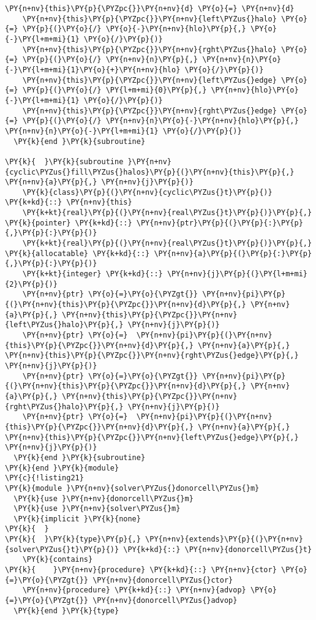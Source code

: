 \begin{Verbatim}[commandchars=\\\{\}]
    \PY{n+nv}{this}\PY{p}{\PYZpc{}}\PY{n+nv}{d} \PY{o}{=} \PY{n+nv}{d}
    \PY{n+nv}{this}\PY{p}{\PYZpc{}}\PY{n+nv}{left\PYZus{}halo} \PY{o}{=} \PY{p}{(}\PY{o}{/} \PY{o}{-}\PY{n+nv}{hlo}\PY{p}{,} \PY{o}{-}\PY{l+m+mi}{1} \PY{o}{/}\PY{p}{)} 
    \PY{n+nv}{this}\PY{p}{\PYZpc{}}\PY{n+nv}{rght\PYZus{}halo} \PY{o}{=} \PY{p}{(}\PY{o}{/} \PY{n+nv}{n}\PY{p}{,} \PY{n+nv}{n}\PY{o}{-}\PY{l+m+mi}{1}\PY{o}{+}\PY{n+nv}{hlo} \PY{o}{/}\PY{p}{)} 
    \PY{n+nv}{this}\PY{p}{\PYZpc{}}\PY{n+nv}{left\PYZus{}edge} \PY{o}{=} \PY{p}{(}\PY{o}{/} \PY{l+m+mi}{0}\PY{p}{,} \PY{n+nv}{hlo}\PY{o}{-}\PY{l+m+mi}{1} \PY{o}{/}\PY{p}{)}
    \PY{n+nv}{this}\PY{p}{\PYZpc{}}\PY{n+nv}{rght\PYZus{}edge} \PY{o}{=} \PY{p}{(}\PY{o}{/} \PY{n+nv}{n}\PY{o}{-}\PY{n+nv}{hlo}\PY{p}{,} \PY{n+nv}{n}\PY{o}{-}\PY{l+m+mi}{1} \PY{o}{/}\PY{p}{)}
  \PY{k}{end }\PY{k}{subroutine}

\PY{k}{  }\PY{k}{subroutine }\PY{n+nv}{cyclic\PYZus{}fill\PYZus{}halos}\PY{p}{(}\PY{n+nv}{this}\PY{p}{,} \PY{n+nv}{a}\PY{p}{,} \PY{n+nv}{j}\PY{p}{)}
    \PY{k}{class}\PY{p}{(}\PY{n+nv}{cyclic\PYZus{}t}\PY{p}{)} \PY{k+kd}{::} \PY{n+nv}{this}
    \PY{k+kt}{real}\PY{p}{(}\PY{n+nv}{real\PYZus{}t}\PY{p}{)}\PY{p}{,} \PY{k}{pointer} \PY{k+kd}{::} \PY{n+nv}{ptr}\PY{p}{(}\PY{p}{:}\PY{p}{,}\PY{p}{:}\PY{p}{)}
    \PY{k+kt}{real}\PY{p}{(}\PY{n+nv}{real\PYZus{}t}\PY{p}{)}\PY{p}{,} \PY{k}{allocatable} \PY{k+kd}{::} \PY{n+nv}{a}\PY{p}{(}\PY{p}{:}\PY{p}{,}\PY{p}{:}\PY{p}{)}
    \PY{k+kt}{integer} \PY{k+kd}{::} \PY{n+nv}{j}\PY{p}{(}\PY{l+m+mi}{2}\PY{p}{)}
    \PY{n+nv}{ptr} \PY{o}{=}\PY{o}{\PYZgt{}} \PY{n+nv}{pi}\PY{p}{(}\PY{n+nv}{this}\PY{p}{\PYZpc{}}\PY{n+nv}{d}\PY{p}{,} \PY{n+nv}{a}\PY{p}{,} \PY{n+nv}{this}\PY{p}{\PYZpc{}}\PY{n+nv}{left\PYZus{}halo}\PY{p}{,} \PY{n+nv}{j}\PY{p}{)} 
    \PY{n+nv}{ptr} \PY{o}{=}  \PY{n+nv}{pi}\PY{p}{(}\PY{n+nv}{this}\PY{p}{\PYZpc{}}\PY{n+nv}{d}\PY{p}{,} \PY{n+nv}{a}\PY{p}{,} \PY{n+nv}{this}\PY{p}{\PYZpc{}}\PY{n+nv}{rght\PYZus{}edge}\PY{p}{,} \PY{n+nv}{j}\PY{p}{)}
    \PY{n+nv}{ptr} \PY{o}{=}\PY{o}{\PYZgt{}} \PY{n+nv}{pi}\PY{p}{(}\PY{n+nv}{this}\PY{p}{\PYZpc{}}\PY{n+nv}{d}\PY{p}{,} \PY{n+nv}{a}\PY{p}{,} \PY{n+nv}{this}\PY{p}{\PYZpc{}}\PY{n+nv}{rght\PYZus{}halo}\PY{p}{,} \PY{n+nv}{j}\PY{p}{)} 
    \PY{n+nv}{ptr} \PY{o}{=}  \PY{n+nv}{pi}\PY{p}{(}\PY{n+nv}{this}\PY{p}{\PYZpc{}}\PY{n+nv}{d}\PY{p}{,} \PY{n+nv}{a}\PY{p}{,} \PY{n+nv}{this}\PY{p}{\PYZpc{}}\PY{n+nv}{left\PYZus{}edge}\PY{p}{,} \PY{n+nv}{j}\PY{p}{)}
  \PY{k}{end }\PY{k}{subroutine}
\PY{k}{end }\PY{k}{module}
\PY{c}{!listing21}
\PY{k}{module }\PY{n+nv}{solver\PYZus{}donorcell\PYZus{}m}
  \PY{k}{use }\PY{n+nv}{donorcell\PYZus{}m}
  \PY{k}{use }\PY{n+nv}{solver\PYZus{}m}
  \PY{k}{implicit }\PY{k}{none}
\PY{k}{  }
\PY{k}{  }\PY{k}{type}\PY{p}{,} \PY{n+nv}{extends}\PY{p}{(}\PY{n+nv}{solver\PYZus{}t}\PY{p}{)} \PY{k+kd}{::} \PY{n+nv}{donorcell\PYZus{}t}
    \PY{k}{contains}
\PY{k}{    }\PY{n+nv}{procedure} \PY{k+kd}{::} \PY{n+nv}{ctor} \PY{o}{=}\PY{o}{\PYZgt{}} \PY{n+nv}{donorcell\PYZus{}ctor}
    \PY{n+nv}{procedure} \PY{k+kd}{::} \PY{n+nv}{advop} \PY{o}{=}\PY{o}{\PYZgt{}} \PY{n+nv}{donorcell\PYZus{}advop}
  \PY{k}{end }\PY{k}{type}


\end{Verbatim}
